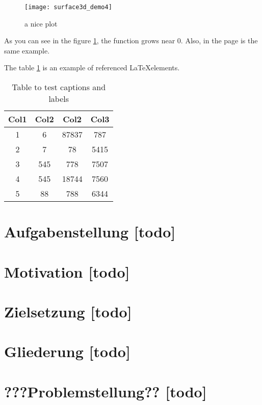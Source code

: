 \begin{figure}[h]
    \centering
    \texttt{[image: surface3d\_demo4]}
    \caption{a nice plot}
    \label{fig:mesh1}
\end{figure}
 
As you can see in the figure \ref{fig:mesh1}, the function grows near 0. Also, in the page \pageref{fig:mesh1} is the same example.

The table \ref{table:1} is an example of referenced \LaTeX elements.
 
\begin{table}[!ht]
\centering
\begin{tabular}{||c c c c||} 
 \hline
 Col1 & Col2 & Col2 & Col3 \\ [0.5ex] 
 \hline\hline
 1 & 6 & 87837 & 787 \\ 
 2 & 7 & 78 & 5415 \\
 3 & 545 & 778 & 7507 \\
 4 & 545 & 18744 & 7560 \\
 5 & 88 & 788 & 6344 \\ [1ex] 
 \hline
\end{tabular}
\caption{Table to test captions and labels}
\label{table:1}
\end{table}

\section{Aufgabenstellung [todo]}

\section{Motivation [todo]}

\section{Zielsetzung [todo]}

\section{Gliederung [todo]}

\section{???Problemstellung?? [todo]}

